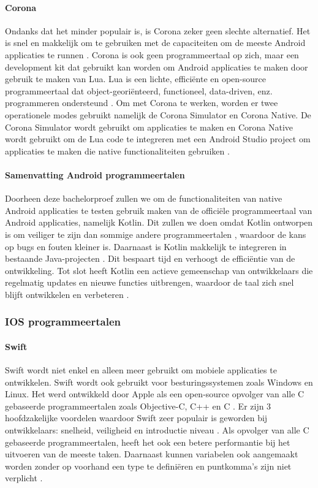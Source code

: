\paragraph{Corona}
Ondanks dat het minder populair is, is Corona zeker geen slechte alternatief. Het is snel 
en makkelijk om te gebruiken met de capaciteiten om de meeste Android applicaties te runnen 
\autocite{Kesavan2021}. Corona is ook geen programmeertaal op zich, maar een development kit 
dat gebruikt kan worden om Android applicaties te maken door gebruik te maken van Lua. Lua is 
een lichte, efficiënte en open-source programmeertaal dat object-georiënteerd, functioneel, 
data-driven, enz. programmeren ondersteund \autocite{Lua2021}. Om met Corona te werken, worden 
er twee operationele modes gebruikt namelijk de Corona Simulator en Corona Native. De Corona 
Simulator wordt gebruikt om applicaties te maken en Corona Native wordt gebruikt om de Lua 
code te integreren met een Android Studio project om applicaties te maken die native 
functionaliteiten gebruiken \autocite{harkiran2022}.

\paragraph{Samenvatting Android programmeertalen}
Doorheen deze bachelorproef zullen we om de functionaliteiten van native Android applicaties 
te testen gebruik maken van de officiële programmeertaal van Android applicaties, 
namelijk Kotlin. Dit zullen we doen omdat Kotlin ontworpen is om veiliger te zijn dan 
sommige andere programmeertalen \autocite{Kesavan2021}, waardoor de kans op bugs en 
fouten kleiner is. Daarnaast is Kotlin makkelijk te integreren in bestaande 
Java-projecten \autocite{Kesavan2021}. Dit bespaart tijd en verhoogt de efficiëntie 
van de ontwikkeling. Tot slot heeft Kotlin een actieve gemeenschap van ontwikkelaars 
die regelmatig updates en nieuwe functies uitbrengen, waardoor de taal zich snel blijft 
ontwikkelen en verbeteren \autocite{Patel2023}.

\subsubsection{IOS programmeertalen}
\paragraph{Swift}
Swift wordt niet enkel en alleen meer gebruikt om mobiele applicaties te ontwikkelen. 
Swift wordt ook gebruikt voor besturingssystemen zoals Windows en Linux. Het werd 
ontwikkeld door Apple als een open-source opvolger van alle C gebaseerde programmeertalen 
zoals Objective-C, C++ en C \autocite{Coursera2022}. Er zijn 3 hoofdzakelijke voordelen 
waardoor Swift zeer populair is geworden bij ontwikkelaars: snelheid, veiligheid en 
introductie niveau \autocite{yuvraj2022}. Als opvolger van alle C gebaseerde programmeertalen, 
heeft het ook een betere performantie bij het uitvoeren van de meeste taken. Daarnaast kunnen 
variabelen ook aangemaakt worden zonder op voorhand een type te definiëren en puntkomma's 
zijn niet verplicht \autocite{Thorndyke2021}.

